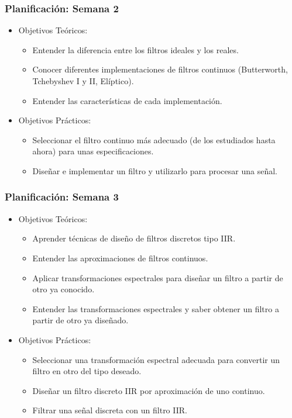 \begin{frame}
  \frametitle{Planificación: Semana 2}

  \begin{itemize}
    \item Objetivos Teóricos:
    \begin{itemize}
      \item Entender la diferencia entre los filtros ideales y los reales.  
      \item Conocer diferentes implementaciones de filtros continuos (Butterworth, Tchebyshev I y II, Elíptico).
      \item Entender las características de cada implementación.
    \end{itemize}
    \item Objetivos Prácticos:
    \begin{itemize}
      \item Seleccionar el filtro continuo más adecuado (de los estudiados hasta ahora) para unas especificaciones.
      \item Diseñar e implementar un filtro y utilizarlo para procesar una señal.
    \end{itemize}
  \end{itemize}
\end{frame}

\begin{frame}
  \frametitle{Planificación: Semana 3}

  \begin{itemize}
    \item Objetivos Teóricos:
    \begin{itemize}
      \item Aprender técnicas de diseño de filtros discretos tipo IIR.
      \item Entender las aproximaciones de filtros continuos.
      \item Aplicar transformaciones espectrales para diseñar un filtro a partir de otro ya conocido.
      \item Entender las transformaciones espectrales y saber obtener un filtro a partir de otro ya diseñado.
    \end{itemize}
    \item Objetivos Prácticos:
    \begin{itemize}
      \item Seleccionar una transformación espectral adecuada para convertir un filtro en otro del tipo deseado.
      \item Diseñar un filtro discreto IIR por aproximación de uno continuo.
      \item Filtrar una señal discreta con un filtro IIR.
    \end{itemize}
  \end{itemize}
\end{frame}



